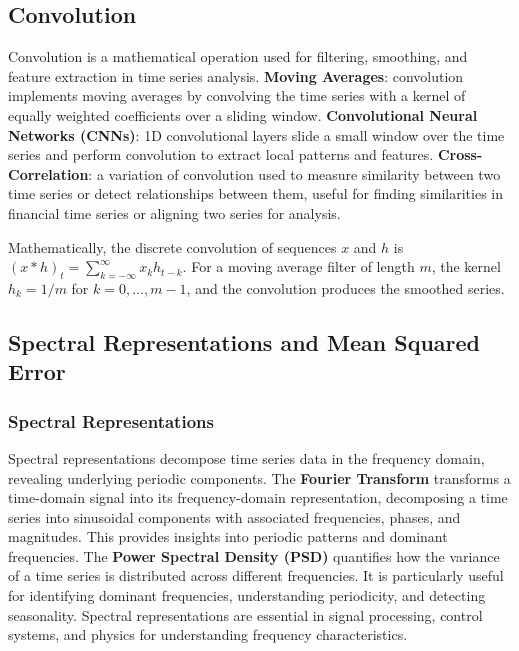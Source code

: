 \documentclass[11pt,a4paper]{article}
\begin{document}
\subsection{Convolution}

Convolution is a mathematical operation used for filtering, smoothing, and feature extraction in time series analysis. \textbf{Moving Averages}: convolution implements moving averages by convolving the time series with a kernel of equally weighted coefficients over a sliding window. \textbf{Convolutional Neural Networks (CNNs)}: 1D convolutional layers slide a small window over the time series and perform convolution to extract local patterns and features. \textbf{Cross-Correlation}: a variation of convolution used to measure similarity between two time series or detect relationships between them, useful for finding similarities in financial time series or aligning two series for analysis.

Mathematically, the discrete convolution of sequences $x$ and $h$ is $(x * h)_t = \sum_{k=-\infty}^{\infty} x_k h_{t-k}$. For a moving average filter of length $m$, the kernel $h_k = 1/m$ for $k = 0, \ldots, m-1$, and the convolution produces the smoothed series.

\subsection{Spectral Representations and Mean Squared Error}

\subsubsection{Spectral Representations}

Spectral representations decompose time series data in the frequency domain, revealing underlying periodic components. The \textbf{Fourier Transform} transforms a time-domain signal into its frequency-domain representation, decomposing a time series into sinusoidal components with associated frequencies, phases, and magnitudes. This provides insights into periodic patterns and dominant frequencies. The \textbf{Power Spectral Density (PSD)} quantifies how the variance of a time series is distributed across different frequencies. It is particularly useful for identifying dominant frequencies, understanding periodicity, and detecting seasonality. Spectral representations are essential in signal processing, control systems, and physics for understanding frequency characteristics.
\end{document}
